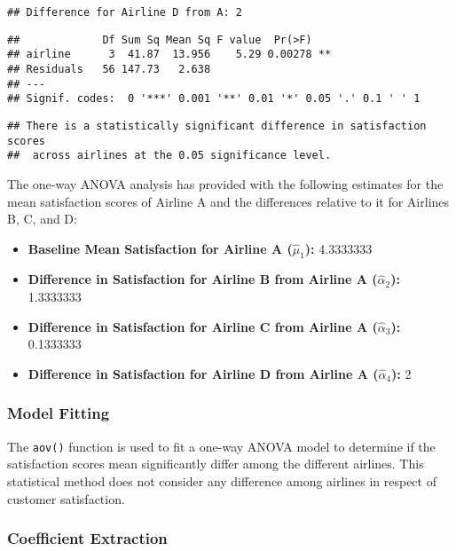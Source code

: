 \documentclass[
]{article}
\providecommand{\tightlist}{%
  \setlength{\itemsep}{0pt}\setlength{\parskip}{0pt}}
\begin{document}
\begin{verbatim}
## Difference for Airline D from A: 2
\end{verbatim}

\begin{verbatim}
##             Df Sum Sq Mean Sq F value  Pr(>F)   
## airline      3  41.87  13.956    5.29 0.00278 **
## Residuals   56 147.73   2.638                   
## ---
## Signif. codes:  0 '***' 0.001 '**' 0.01 '*' 0.05 '.' 0.1 ' ' 1
\end{verbatim}

\begin{verbatim}
## There is a statistically significant difference in satisfaction scores
##  across airlines at the 0.05 significance level.
\end{verbatim}

The one-way ANOVA analysis has provided with the following estimates for
the mean satisfaction scores of Airline A and the differences relative
to it for Airlines B, C, and D:

\begin{itemize}
\tightlist
\item
  \textbf{Baseline Mean Satisfaction for Airline A (\(\hat{\mu}_1\)):}
  4.3333333
\item
  \textbf{Difference in Satisfaction for Airline B from Airline A
  (\(\hat{\alpha}_2\)):} 1.3333333
\item
  \textbf{Difference in Satisfaction for Airline C from Airline A
  (\(\hat{\alpha}_3\)):} 0.1333333
\item
  \textbf{Difference in Satisfaction for Airline D from Airline A
  (\(\hat{\alpha}_4\)):} 2
\end{itemize}

\subsubsection{Model Fitting}\label{model-fitting}

The \texttt{aov()} function is used to fit a one-way ANOVA model to
determine if the satisfaction scores mean significantly differ among the
different airlines. This statistical method does not consider any
difference among airlines in respect of customer satisfaction.

\subsubsection{Coefficient Extraction}\label{coefficient-extraction}
\end{document}
